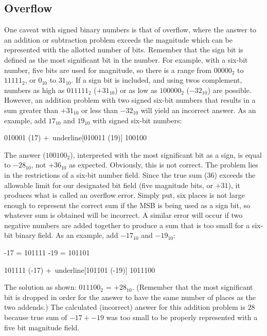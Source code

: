 \subsection{Overflow}
\label{MO:sub:overflow}

One caveat with signed binary numbers is that of overflow, where the answer to an addition or subtraction problem exceeds the magnitude which can be represented with the allotted number of bits. Remember that the sign bit is defined as the most significant bit in the number. For example, with a six-bit number, five bits are used for magnitude, so there is a range from $ 00000_2 $ to $ 11111_2 $, or $ 0_{10} $ to $ 31_{10} $. If a sign bit is included, and using twos complement, numbers as high as $ 011111_2 $ ($ +31_{10} $) or as low as $ 100000_2 $ ($ -32_{10} $) are possible. However, an addition problem with two signed six-bit numbers that results in a sum greater than $ +31_{10} $ or less than $ -32_{10} $ will yield an incorrect answer. As an example, add $ 17_{10} $ and $ 19_{10} $ with signed six-bit numbers: 

\begin{binDisp}[commandchars=~\[\]]
     010001  (17)
    +~underline[010011  (19)]
     100100
\end{binDisp}

The answer ($ 100100_2 $), interpreted with the most significant bit as a sign, is equal to $ -28_{10} $, not $ +36_{10} $ as expected. Obviously, this is not correct. The problem lies in the restrictions of a six-bit number field. Since the true sum ($ 36 $) exceeds the allowable limit for our designated bit field (five magnitude bits, or $ +31 $), it produces what is called an overflow error. Simply put, six places is not large enough to represent the correct sum if the \ac{MSB} is being used as a sign bit, so whatever sum is obtained will be incorrect. A similar error will occur if two negative numbers are added together to produce a sum that is too small for a six-bit binary field. As an example, add $ -17_{10} $ and $ -19_{10} $: 

\begin{binDisp}[commandchars=~\[\]]
     -17 = 101111
     -19 = 101101

     101111  (-17)
    +~underline[101101  (-19)]
    1011100
\end{binDisp}

The solution as shown: $ 011100_2 $ = $ +28_{10} $. (Remember that the most significant bit is dropped in order for the answer to have the same number of places as the two addends.) The calculated (incorrect) answer for this addition problem is $ 28 $ because true sum of $ -17 + -19 $ was too small to be properly represented with a five bit magnitude field.

